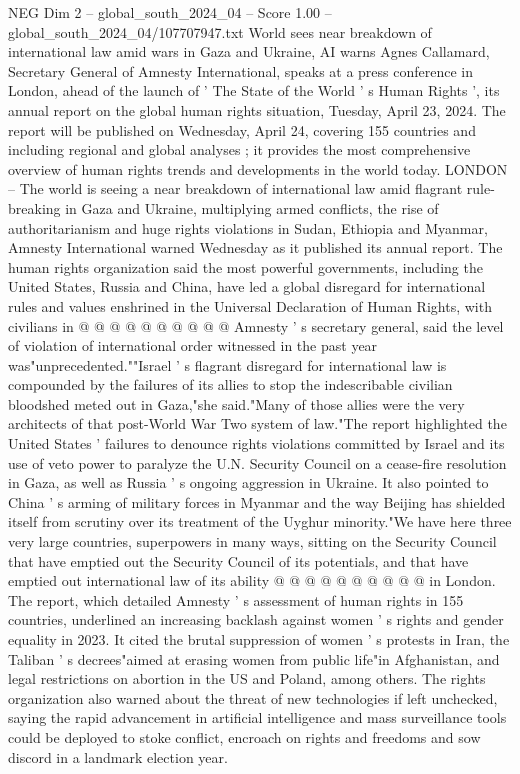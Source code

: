 \begin{textsample}{NEG Dim 2 – global\_south\_2024\_04 – Score 1.00 – global\_south\_2024\_04/107707947.txt}  \label{ex:f2_neg_293}
World sees near breakdown of international law amid wars in Gaza and Ukraine, AI warns Agnes Callamard, Secretary General of Amnesty International, speaks at a press conference in London, ahead of the launch of ' The State of the World ' s Human Rights ', its annual report on the global human rights situation, Tuesday, April 23, 2024.
The report will be published on Wednesday, April 24, covering 155 countries and including regional and global analyses ; it provides the most comprehensive overview of human rights trends and developments in the world today.
LONDON -- The world is seeing a near breakdown of international law amid flagrant rule-breaking in Gaza and Ukraine, multiplying armed conflicts, the rise of authoritarianism and huge rights violations in Sudan, Ethiopia and Myanmar, Amnesty International warned Wednesday as it published its annual report.
The human rights organization said the most powerful governments, including the United States, Russia and China, have led a global disregard for international rules and values enshrined in the Universal Declaration of Human Rights, with civilians in @ @ @ @ @ @ @ @ @ @ Amnesty ' s secretary general, said the level of violation of international order witnessed in the past year was"unprecedented.""Israel ' s flagrant disregard for international law is compounded by the failures of its allies to stop the indescribable civilian bloodshed meted out in Gaza,"she said."Many of those allies were the very architects of that post-World War Two system of law."The report highlighted the United States ' failures to denounce rights violations committed by Israel and its use of veto power to paralyze the U.N.
Security Council on a cease-fire resolution in Gaza, as well as Russia ' s ongoing aggression in Ukraine.
It also pointed to China ' s arming of military forces in Myanmar and the way Beijing has shielded itself from scrutiny over its treatment of the Uyghur minority."We have here three very large countries, superpowers in many ways, sitting on the Security Council that have emptied out the Security Council of its potentials, and that have emptied out international law of its ability @ @ @ @ @ @ @ @ @ @ in London.
The report, which detailed Amnesty ' s assessment of human rights in 155 countries, underlined an increasing backlash against women ' s rights and gender equality in 2023.
It cited the brutal suppression of women ' s protests in Iran, the Taliban ' s decrees"aimed at erasing women from public life"in Afghanistan, and legal restrictions on abortion in the US and Poland, among others.
The rights organization also warned about the threat of new technologies if left unchecked, saying the rapid advancement in artificial intelligence and mass surveillance tools could be deployed to stoke conflict, encroach on rights and freedoms and sow discord in a landmark election year.

\end{textsample}
